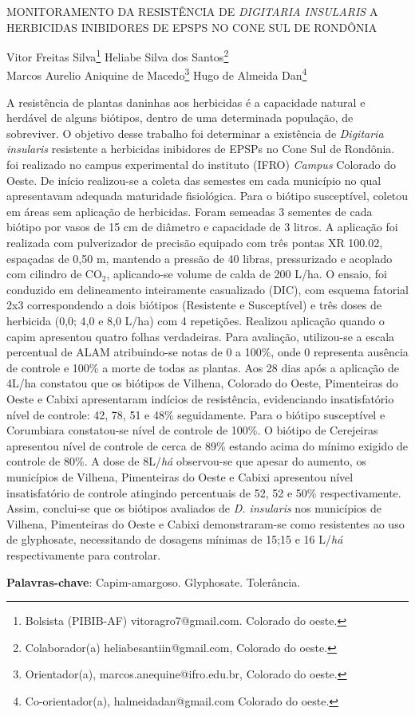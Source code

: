 \documentclass[article,12pt,onesidea,4paper,english,brazil]{abntex2}
\begin{document}
	
	
	\frenchspacing 
	
	\begin{center}
		\LARGE MONITORAMENTO DA RESISTÊNCIA DE \textit{DIGITARIA INSULARIS} A
		HERBICIDAS INIBIDORES DE EPSPS NO CONE SUL DE RONDÔNIA
		
		\normalsize
		Vitor Freitas Silva\footnote{Bolsista (PIBIB-AF) vitoragro7@gmail.com. Colorado do oeste.} 
		Heliabe Silva dos Santos\footnote{Colaborador(a) heliabesantiin@gmail.com, Colorado do oeste.} \\
		Marcos Aurelio Aniquine de Macedo\footnote{Orientador(a), marcos.anequine@ifro.edu.br, Colorado do oeste.} 
		Hugo de Almeida Dan\footnote{Co-orientador(a), halmeidadan@gmail.com Colorado do oeste.} 
	\end{center}
	
	\noindent A resistência de plantas daninhas aos herbicidas é a capacidade natural e herdável
	de alguns biótipos, dentro de uma determinada população, de sobreviver. O objetivo
	desse trabalho foi determinar a existência de \textit{Digitaria insularis} resistente a
	herbicidas inibidores de EPSPs no Cone Sul de Rondônia. foi realizado no campus
	experimental do instituto (IFRO) \textit{Campus} Colorado do Oeste. De início realizou-se a
	coleta das semestes em cada município no qual apresentavam adequada
	maturidade fisiológica. Para o biótipo susceptível, coletou em áreas sem aplicação
	de herbicidas. Foram semeadas 3 sementes de cada biótipo por vasos de 15 cm de
	diâmetro e capacidade de 3 litros. A aplicação foi realizada com pulverizador de
	precisão equipado com três pontas XR 100.02, espaçadas de 0,50 m, mantendo a
	pressão de 40 libras, pressurizado e acoplado com cilindro de CO$_2$, aplicando-se
	volume de calda de 200 L/ha. O ensaio, foi conduzido em delineamento inteiramente
	casualizado (DIC), com esquema fatorial 2x3 correspondendo a dois biótipos
	(Resistente e Susceptível) e três doses de herbicida (0,0; 4,0 e 8,0 L/ha) com 4
	repetições. Realizou aplicação quando o capim apresentou quatro folhas
	verdadeiras. Para avaliação, utilizou-se a escala percentual de ALAM atribuindo-se
	notas de 0 a 100\%, onde 0 representa ausência de controle e 100\% a morte de
	todas as plantas. Aos 28 dias após a aplicação de 4L/ha constatou que os biótipos
	de Vilhena, Colorado do Oeste, Pimenteiras do Oeste e Cabixi apresentaram
	indícios de resistência, evidenciando insatisfatório nível de controle: 42, 78, 51 e
	48\% seguidamente. Para o biótipo susceptível e Corumbiara constatou-se nível de
	controle de 100\%. O biótipo de Cerejeiras apresentou nível de controle de cerca de
	89\% estando acima do mínimo exigido de controle de 80\%. A dose de 8L/\textit{há}
	observou-se que apesar do aumento, os municípios de Vilhena, Pimenteiras do
	Oeste e Cabixi apresentou nível insatisfatório de controle atingindo percentuais de
	52, 52 e 50\% respectivamente. Assim, conclui-se que os biótipos avaliados de \textit{D.
	insularis} nos municípios de Vilhena, Pimenteiras do Oeste e Cabixi demonstraram-se
	como resistentes ao uso de glyphosate, necessitando de dosagens mínimas de
	15;15 e 16 L/\textit{há} respectivamente para controlar.
	
	\vspace{\onelineskip}
	
	\noindent
	\textbf{Palavras-chave}: Capim-amargoso. Glyphosate. Tolerância.	
\end{document}
